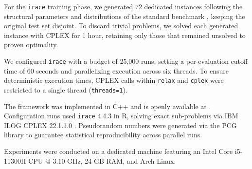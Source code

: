 For the \texttt{irace} training phase, we generated 72 dedicated instances following the structural parameters and distributions of the standard benchmark \citep{baptiste2008lagrangian}, keeping the original test set disjoint.
To discard trivial problems, we solved each generated instance with CPLEX for 1 hour, retaining only those that remained unsolved to proven optimality.

We configured \texttt{irace} with a budget of 25,000 runs, setting a per-evaluation cutoff time of 60 seconds and parallelizing execution across six threads.
To ensure deterministic execution times, CPLEX calls within \texttt{relax} and \texttt{cplex} were restricted to a single thread (\texttt{threads=1}).

The framework was implemented in C++ and is openly available at \citet{leles2026jitjss}. Configuration runs used \texttt{irace} 4.4.3 \citep{lopez2016irace} in R, solving exact sub-problems via IBM ILOG CPLEX 22.1.1.0 \citep{cplex22}. Pseudorandom numbers were generated via the PCG library \citep{oneill:pcg2014} to guarantee statistical reproducibility across parallel runs.

Experiments were conducted on a dedicated machine featuring an Intel Core i5-11300H CPU @ 3.10 GHz, 24 GB RAM, and Arch Linux.

